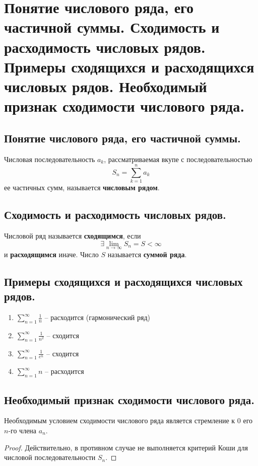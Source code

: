 \section{Понятие числового ряда, его частичной суммы. Сходимость и расходимость числовых рядов. Примеры сходящихся и расходящихся числовых рядов. Необходимый признак сходимости числового ряда.}

\subsection{Понятие числового ряда, его частичной суммы.}
\begin{definition}
    Числовая последовательность $a_k$, рассматриваемая вкупе с последовательностью
    \[
        S_n = \sum_{k=1}^{n} a_k
    \]
    ее частичных сумм, называется \textbf{числовым рядом}.
\end{definition}

\subsection{Сходимость и расходимость числовых рядов.}
\begin{definition}
    Числовой ряд называется \textbf{сходящимся}, если
    \[
        \exists \lim_{n \to \infty} S_n = S < \infty
    \]
    и \textbf{расходящимся} иначе. Число $S$ называется \textbf{суммой ряда}.
\end{definition}

\subsection{Примеры сходящихся и расходящихся числовых рядов.}
\begin{enumerate}
    \item $\sum_{n=1}^{\infty} \frac{1}{n}$ -- расходится (гармонический ряд)
    \item $\sum_{n=1}^{\infty} \frac{1}{n^2}$ -- сходится
    \item $\sum_{n=1}^{\infty} \frac{1}{e^n}$ -- сходится
    \item $\sum_{n=1}^{\infty} n$ -- расходится
\end{enumerate}

\subsection{Необходимый признак сходимости числового ряда.}
\begin{theorem}
    Необходимым условием сходимости числового ряда является стремление к 0 его $n$-го члена $a_n$.
    \begin{proof}
        Действительно, в противном случае не выполняется критерий Коши для числовой последовательности $S_n$.
    \end{proof}
\end{theorem}